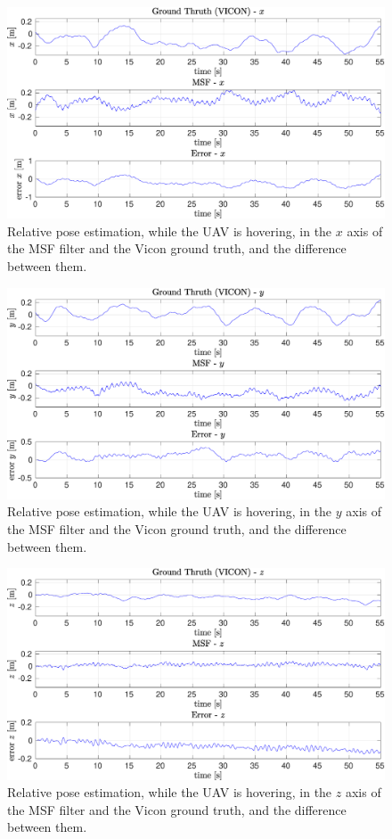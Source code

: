 \begin{figure}[H]
\centering
\includegraphics[width=1\textwidth]{images/res_x}
\caption{Relative pose estimation, while the \ac{UAV} is hovering, in the $x$ 
axis of the \ac{MSF} filter and the Vicon ground truth, and the difference 
between them.}
\label{fig:res_x}
\end{figure}

\begin{figure}[H]
\centering
\includegraphics[width=1\textwidth]{images/res_y}
\caption{Relative pose estimation, while the \ac{UAV} is hovering, in the $y$ 
axis of the \ac{MSF} filter and the Vicon ground truth, and the difference 
between them.}
\label{fig:res_y}
\end{figure}

\begin{figure}[H]
\centering
\includegraphics[width=1\textwidth]{images/res_z}
\caption{Relative pose estimation, while the \ac{UAV} is hovering, in the $z$ 
axis of the \ac{MSF} filter and the Vicon ground truth, and the difference 
between them.}
\label{fig:res_z}
\end{figure}



